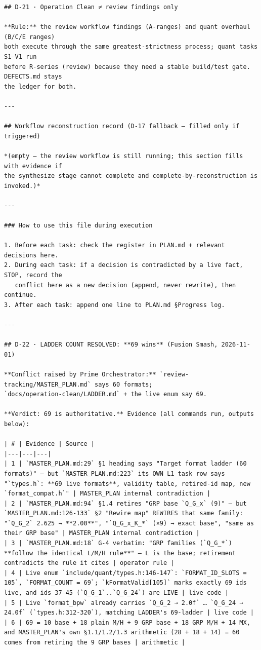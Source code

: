 \begin{verbatim}
## D-21 · Operation Clean ≠ review findings only

**Rule:** the review workflow findings (A-ranges) and quant overhaul (B/C/E ranges)
both execute through the same greatest-strictness process; quant tasks S1–V1 run
before R-series (review) because they need a stable build/test gate. DEFECTS.md stays
the ledger for both.

---

## Workflow reconstruction record (D-17 fallback — filled only if triggered)

*(empty — the review workflow is still running; this section fills with evidence if
the synthesize stage cannot complete and complete-by-reconstruction is invoked.)*

---

### How to use this file during execution

1. Before each task: check the register in PLAN.md + relevant decisions here.
2. During each task: if a decision is contradicted by a live fact, STOP, record the
   conflict here as a new decision (append, never rewrite), then continue.
3. After each task: append one line to PLAN.md §Progress log.

---

## D-22 · LADDER COUNT RESOLVED: **69 wins** (Fusion Smash, 2026-11-01)

**Conflict raised by Prime Orchestrator:** `review-tracking/MASTER_PLAN.md` says 60 formats;
`docs/operation-clean/LADDER.md` + the live enum say 69.

**Verdict: 69 is authoritative.** Evidence (all commands run, outputs below):

| # | Evidence | Source |
|---|---|---|
| 1 | `MASTER_PLAN.md:29` §1 heading says "Target format ladder (60 formats)" — but `MASTER_PLAN.md:223` its OWN L1 task row says "`types.h`: **69 live formats**, validity table, retired-id map, new `format_compat.h`" | MASTER_PLAN internal contradiction |
| 2 | `MASTER_PLAN.md:94` §1.4 retires "GRP base `Q_G_x` (9)" — but `MASTER_PLAN.md:126-133` §2 "Rewire map" REWIRES that same family: "`Q_G_2` 2.625 → **2.00**", "`Q_G_x_K_*` (×9) → exact base", "same as their GRP base" | MASTER_PLAN internal contradiction |
| 3 | `MASTER_PLAN.md:18` G-4 verbatim: "GRP families (`Q_G_*`) **follow the identical L/M/H rule**" — L is the base; retirement contradicts the rule it cites | operator rule |
| 4 | Live enum `include/quant/types.h:146-147`: `FORMAT_ID_SLOTS = 105`, `FORMAT_COUNT = 69`; `kFormatValid[105]` marks exactly 69 ids live, and ids 37–45 (`Q_G_1`..`Q_G_24`) are LIVE | live code |
| 5 | Live `format_bpw` already carries `Q_G_2 → 2.0f` … `Q_G_24 → 24.0f` (`types.h:312-320`), matching LADDER's 69-ladder | live code |
| 6 | 69 = 10 base + 18 plain M/H + 9 GRP base + 18 GRP M/H + 14 MX, and MASTER_PLAN's own §1.1/1.2/1.3 arithmetic (28 + 18 + 14) = 60 comes from retiring the 9 GRP bases | arithmetic |


\end{verbatim}
